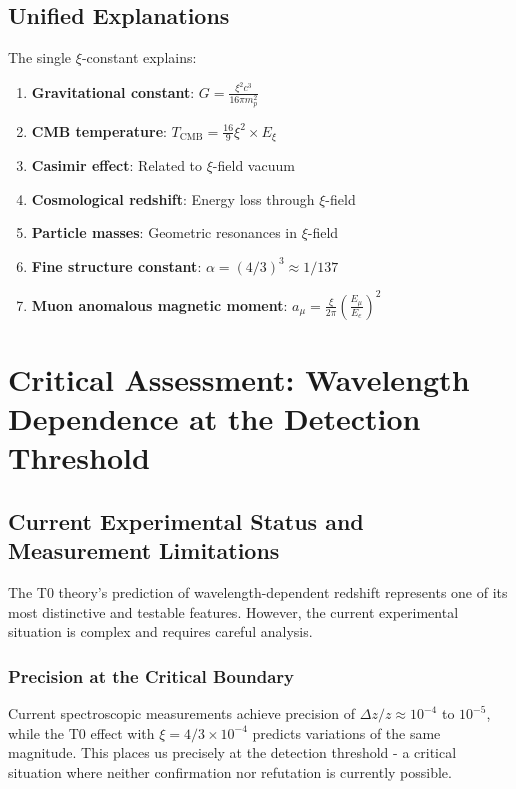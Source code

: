 \documentclass[12pt,a4paper]{article}
\theoremstyle{definition}
\begin{document}
	\subsection{Unified Explanations}
	
	The single $\xi$-constant explains:
	\begin{enumerate}
		\item \textbf{Gravitational constant}: $G = \frac{\xi^2 c^3}{16\pi m_p^2}$
		\item \textbf{CMB temperature}: $T_{\text{CMB}} = \frac{16}{9} \xi^2 \times E_\xi$
		\item \textbf{Casimir effect}: Related to $\xi$-field vacuum
		\item \textbf{Cosmological redshift}: Energy loss through $\xi$-field
		\item \textbf{Particle masses}: Geometric resonances in $\xi$-field
		\item \textbf{Fine structure constant}: $\alpha = (4/3)^3 \approx 1/137$
		\item \textbf{Muon anomalous magnetic moment}: $a_\mu = \frac{\xi}{2\pi} \left(\frac{E_\mu}{E_e}\right)^2$
	\end{enumerate}
	
	\section{Critical Assessment: Wavelength Dependence at the Detection Threshold}
	\label{sec:wavelength_assessment}
	
	\subsection{Current Experimental Status and Measurement Limitations}
	
	The T0 theory's prediction of wavelength-dependent redshift represents one of its most distinctive and testable features. However, the current experimental situation is complex and requires careful analysis.
	
	\subsubsection{Precision at the Critical Boundary}
	
	Current spectroscopic measurements achieve precision of $\Delta z/z \approx 10^{-4}$ to $10^{-5}$, while the T0 effect with $\xi = 4/3 \times 10^{-4}$ predicts variations of the same magnitude. This places us precisely at the detection threshold - a critical situation where neither confirmation nor refutation is currently possible.
	
\end{document}

